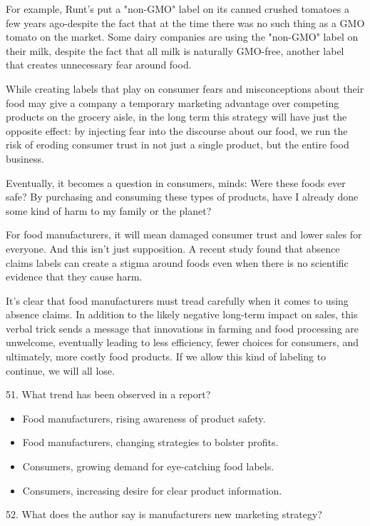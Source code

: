 \documentclass[UTF8,11pt]{ctexart}
\begin{document}
For example, Runt's put a "non-GMO" label on its canned crushed tomatoes a few years ago-despite the fact that at the time there was no such thing as a GMO tomato on the market. Some dairy companies are using the "non-GMO" label on their milk, despite the fact that all milk is naturally GMO-free, another label that creates unnecessary fear around food.


While creating labels that play on consumer fears and misconceptions about their food may give a company a temporary marketing advantage over competing products on the grocery aisle, in the long term this strategy will have just the opposite effect: by injecting fear into the discourse about our food, we run the risk of eroding consumer trust in not just a single product, but the entire food business.


Eventually, it becomes a question in consumers, minds: Were these foods ever safe? By purchasing and consuming these types of products, have I already done some kind of harm to my family or the planet?


For food manufacturers, it will mean damaged consumer trust and lower sales for everyone. And this isn't just supposition. A recent study found that absence claims labels can create a stigma around foods even when there is no scientific evidence that they cause harm.


It's clear that food manufacturers must tread carefully when it comes to using absence claims. In addition to the likely negative long-term impact on sales, this verbal trick sends a message that innovations in farming and food processing are unwelcome, eventually leading to less efficiency, fewer choices for consumers, and ultimately, more costly food products. If we allow this kind of labeling to continue, we will all lose.


51. What trend has been observed in a report?


\begin{itemize}[leftmargin=2em,itemsep=.2em,topsep=.4em]\item[A.] Food manufacturers, rising awareness of product safety.
\item[B.] Food manufacturers, changing strategies to bolster profits.
\item[C.] Consumers, growing demand for eye-catching food labels.
\item[D.] Consumers, increasing desire for clear product information.
\end{itemize}

52. What does the author say is manufacturers new marketing strategy?
\end{document}

